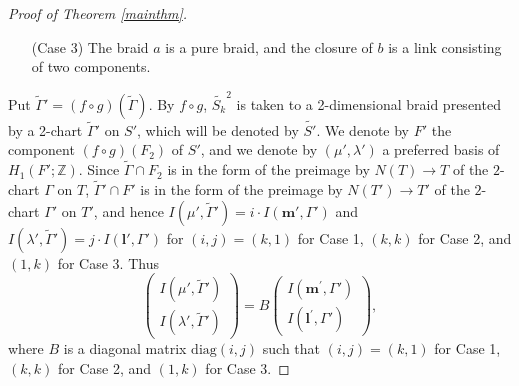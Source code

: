 \documentclass[a4paper,11pt]{amsart}
\numberwithin{equation}{section}
\begin{document}
\begin{proof}[Proof of Theorem \ref{mainthm}]
\begin{sloppypar}
\begin{enumerate}
\item[(Case 3)]
 The braid $a$ is a pure braid, and the closure of $b$ is a link consisting of two components. 
\end{enumerate}

Put $\widetilde{\Gamma}'= (f \circ g)(\widetilde{\Gamma})$. By $f\circ g$, $\widetilde{S_k}^2$ is taken to a 2-dimensional braid presented by a 2-chart $\widetilde{\Gamma}'$ on $S'$, which will be denoted by $\widetilde{S'}$. 
We denote by $F'$ the component $(f \circ g)(F_2)$ of $S'$, and we denote by $(\mu', \lambda')$ a preferred basis of $H_1(F'; \mathbb{Z})$. 
Since $\widetilde{\Gamma} \cap F_2$  is in the form of the preimage by $N(T) \to T$ of the $2$-chart $\Gamma$ on $T$, $\widetilde{\Gamma}' \cap F'$ is in the form of the preimage by $N(T') \to T'$ of the $2$-chart $\Gamma'$ on $T'$, and hence 
$I(\mu', \widetilde{\Gamma}')=i \cdot I(\mathbf{m}', \Gamma')$ and $I(\lambda', \widetilde{\Gamma}')=j \cdot I(\mathbf{l}', \Gamma')$ for $(i,j)=(k,1)$ for Case 1, $(k,k)$ for Case 2, and $(1,k)$ for Case 3. 
Thus 
\begin{equation}\label{0323-4}
\begin{pmatrix} I(\mu', \widetilde{\Gamma}') \\ I(\lambda', \widetilde{\Gamma}')\end{pmatrix}=B\begin{pmatrix} I(\mathbf{m}^\prime, \Gamma') \\ I(\mathbf{l}^\prime, \Gamma')\end{pmatrix},
\end{equation}
 where $B$ is a diagonal matrix $\mathrm{diag} (i,j)$ such that $(i,j)=(k,1)$ for Case 1, $(k,k)$ for Case 2, and $(1,k)$ for Case 3. 


\end{sloppypar}
\end{proof}
\end{document}
